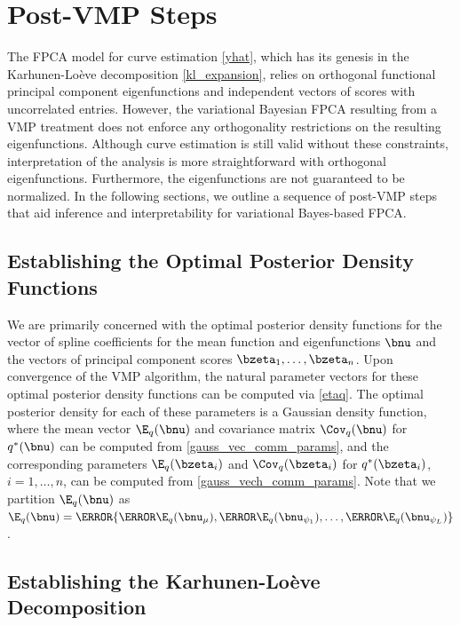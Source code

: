 \documentclass[12pt]{article}
\def\numu{\bnu_\mu}
\newcommand\nupsi[1]{\bnu_{\psi_{#1}}}
\theoremstyle{plain}
\theoremstyle{definition}
\theoremstyle{remark}
\begin{document}
\section{Post-VMP Steps}
\label{sec:post_vmp_steps}

The FPCA model for curve estimation \eqref{yhat}, which has its genesis in the Karhunen-Lo\`{e}ve decomposition
\eqref{kl_expansion}, relies on orthogonal functional principal component
eigenfunctions and independent vectors of scores with uncorrelated entries.
However, the variational Bayesian FPCA resulting from a VMP treatment
does not enforce any orthogonality restrictions on the resulting eigenfunctions. Although curve estimation is still
valid without these constraints, interpretation of the analysis is more straightforward with orthogonal
eigenfunctions. Furthermore, the eigenfunctions are not guaranteed to be normalized.
In the following sections, we outline
a sequence of post-VMP steps that aid inference and interpretability for variational Bayes-based FPCA.


\subsection{Establishing the Optimal Posterior Density Functions}
\label{sec:opt_dens_funcs}

We are primarily concerned with the optimal posterior density functions for the vector of spline coefficients for
the mean function and eigenfunctions $\bnu$ and the vectors of principal component scores $\bzeta_1, \dots,
\bzeta_n$. Upon convergence of the VMP algorithm, the natural parameter vectors for these optimal posterior density
functions can be computed via \eqref{etaq}.
The optimal posterior density for each of these parameters is a Gaussian density
function, where the mean vector $\E_q (\bnu)$ and covariance matrix $\Cov_q (\bnu)$ for $q^* (\bnu)$
can be computed from
\eqref{gauss_vec_comm_params}, and the corresponding parameters $\E_q (\bzeta_i)$ and $\Cov_q (\bzeta_i)$
for $q^* (\bzeta_i)$, $i = 1, \dots, n$, can be
computed from \eqref{gauss_vech_comm_params}. Note that we partition $\E_q (\bnu)$ as $\E_q (\bnu) =
\T{\{ \T{\E_q (\numu)}, \T{\E_q (\nupsi{1})}, \dots, \T{\E_q (\nupsi{L})} \}}$.


\subsection{Establishing the Karhunen-Lo\`{e}ve Decomposition}
\label{sec:biorthogonal}
\end{document}
